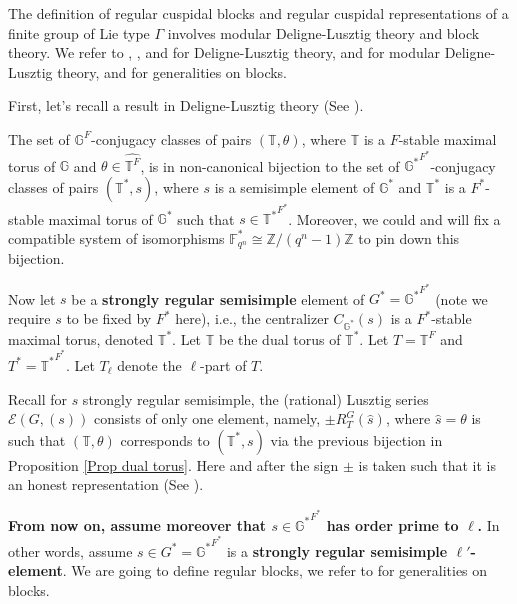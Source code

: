 	The definition of regular cuspidal blocks and regular cuspidal representations of a finite group of Lie type $\Gamma$ involves modular Deligne-Lusztig theory and block theory. We refer to \cite{deligne1976representations}, \cite{carter1985finite}, and \cite{digne2020representations} for Deligne-Lusztig theory, \cite{michel1989bloc} and \cite{broue1990isometries} for modular Deligne-Lusztig theory, and \cite[Appendix B]{bonnafe2010representations} for generalities on blocks. 
	
	First, let's recall a result in Deligne-Lusztig theory (See \cite[Proposition 11.1.5]{digne2020representations}). 
	
	\begin{proposition}\label{Prop dual torus}
		The set of $\mathbb{G}^F$-conjugacy classes of pairs $(\mathbb{T}, \theta)$, where  $\mathbb{T}$ is a $F$-stable maximal torus of  $\mathbb{G}$ and $\theta \in \widehat{\mathbb{T}^F}$, is in non-canonical bijection to the set of $\mathbb{G^*}^{F^*}$-conjugacy classes of pairs $(\mathbb{T}^*, s)$, where $s$ is a semisimple element of $\mathbb{G}^*$ and $\mathbb{T}^*$ is a $F^*$-stable maximal torus of $\mathbb{G}^*$ such that $s \in {\mathbb{T}^*}^{F^*}$.  Moreover, we could and will fix a compatible system of isomorphisms $\mathbb{F}_{q^n}^* \cong \mathbb{Z}/(q^n-1)\mathbb{Z}$ to pin down this bijection.
	\end{proposition}
	
	Now let $s$ be a \textbf{strongly regular semisimple} 
	element of $G^*={\mathbb{G}^*}^{F^*}$ (note we require $s$ to be fixed by $F^*$ here), i.e., the centralizer $C_{\mathbb{G}^*}(s)$ is a $F^*$-stable maximal torus, denoted $\mathbb{T}^*$. Let $\mathbb{T}$ be the dual torus of $\mathbb{T}^*$. Let $T=\mathbb{T}^F$ and $T^*={\mathbb{T}^*}^{F^*}$. Let $T_\ell$ denote the $\ell$-part of $T$.
	
	Recall for $s$ strongly regular semisimple, the (rational) Lusztig series $\mathcal{E}(G, (s))$ consists of only one element, namely, $\pm R_T^G(\hat{s})$, where $\hat{s}=\theta$ is such that $(\mathbb{T}, \theta)$ corresponds to $(\mathbb{T}^*, s)$ via the previous bijection in Proposition \ref{Prop dual torus}. Here and after the sign $\pm$ is taken such that it is an honest representation (See \cite[Section 7.5]{carter1985finite}).
	
	\textbf{From now on, assume moreover that $s \in {\mathbb{G}^*}^{F^*}$ has order prime to $\ell$.} In other words, assume $s \in G^*={\mathbb{G}^*}^{F^*}$ is a \textbf{strongly regular semisimple $\ell'$-element}. We are going to define regular blocks, we refer to \cite[Appendix B]{bonnafe2010representations} for generalities on blocks.
	
